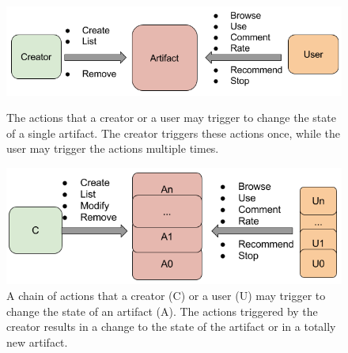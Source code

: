 \begin{figure}[H]
	\includegraphics[scale=0.65]{figures/marketplaces/marketplace_single_artifact.png}
	\caption{The actions that a creator or a user may trigger to change the state of a single artifact. The creator triggers these actions once, while the user may trigger the actions multiple times.}
	\label{fig:figure_marketplace_actions_single}
	\includegraphics[scale=0.65]{figures/marketplaces/marketplace_multiple_artifacts.png}
	\caption{A chain of actions that a creator (C) or a user (U) may trigger to change the state of an artifact (A). The actions triggered by the creator results in a change to the state of the artifact or in a totally new artifact.}
	\label{fig:figure_marketplace_actions_multiple}
\end{figure}


